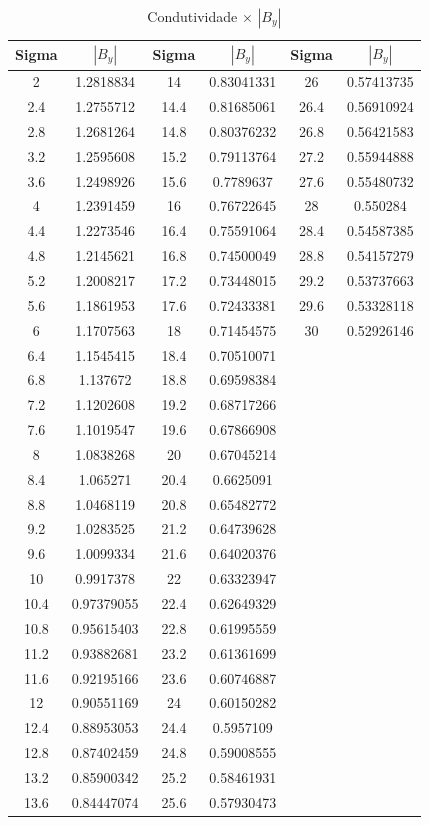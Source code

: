 \documentclass[
	12pt,				%
	openright,			%
	twoside,			%
	a4paper,			%
	english,			%
	french,				%
	spanish,			%
	brazil,				%
	]{abntex2}
\begin{document}
\begin{apendicesenv}
\newpage
\begin{table}[H]
\caption{Condutividade  $\times$  $|B_{y}|$}
\centering
\begin{tabular}{c c| c c | c c}
Sigma & $|B_{y}|$ & Sigma & $|B_{y}|$ & Sigma & $|B_{y}|$ \\
\hline 
2 & 1.2818834 & 14 & 0.83041331 & 26 & 0.57413735\\
2.4 & 1.2755712 & 14.4 & 0.81685061 & 26.4 & 0.56910924\\
2.8 & 1.2681264 & 14.8 & 0.80376232 & 26.8 & 0.56421583\\
3.2 & 1.2595608 & 15.2 & 0.79113764 & 27.2 & 0.55944888\\
3.6 & 1.2498926 & 15.6 & 0.7789637 & 27.6 & 0.55480732\\
4 & 1.2391459 & 16 & 0.76722645 & 28 & 0.550284\\
4.4 & 1.2273546 & 16.4 & 0.75591064 & 28.4 & 0.54587385\\
4.8 & 1.2145621 & 16.8 & 0.74500049 & 28.8 & 0.54157279\\
5.2 & 1.2008217 & 17.2 & 0.73448015 & 29.2 & 0.53737663\\
5.6 & 1.1861953 & 17.6 & 0.72433381 & 29.6 & 0.53328118\\
6 & 1.1707563 & 18 & 0.71454575 & 30 & 0.52926146\\
6.4 & 1.1545415 & 18.4 & 0.70510071\\
6.8 & 1.137672 & 18.8 & 0.69598384\\
7.2 & 1.1202608 & 19.2 & 0.68717266\\
7.6 & 1.1019547 & 19.6 & 0.67866908\\
8 & 1.0838268 & 20 & 0.67045214\\
8.4 & 1.065271 & 20.4 & 0.6625091\\
8.8 & 1.0468119 & 20.8 & 0.65482772\\
9.2 & 1.0283525 & 21.2 & 0.64739628\\
9.6 & 1.0099334 & 21.6 & 0.64020376\\
10 & 0.9917378 & 22 & 0.63323947\\
10.4 & 0.97379055 & 22.4 & 0.62649329\\
10.8 & 0.95615403 & 22.8 & 0.61995559\\
11.2 & 0.93882681 & 23.2 & 0.61361699\\
11.6 & 0.92195166 & 23.6 & 0.60746887\\
12 & 0.90551169 & 24 & 0.60150282\\
12.4 & 0.88953053 & 24.4 & 0.5957109\\
12.8 & 0.87402459 & 24.8 & 0.59008555\\
13.2 & 0.85900342 & 25.2 & 0.58461931 \\
13.6 & 0.84447074 & 25.6 & 0.57930473
\end{tabular}
\end{table}


\end{apendicesenv}
\end{document}

